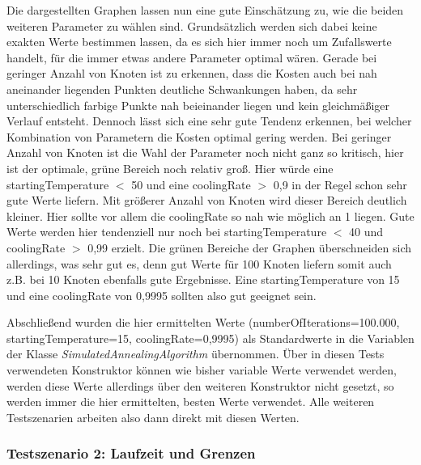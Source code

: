 Die dargestellten Graphen lassen nun eine gute Einschätzung zu, wie die beiden weiteren Parameter zu wählen sind. Grundsätzlich werden sich dabei keine exakten Werte bestimmen lassen, da es sich hier immer noch um Zufallswerte handelt, für die immer etwas andere Parameter optimal wären. Gerade bei geringer Anzahl von Knoten ist zu erkennen, dass die Kosten auch bei nah aneinander liegenden Punkten deutliche Schwankungen haben, da sehr unterschiedlich farbige Punkte nah beieinander liegen und kein gleichmäßiger Verlauf entsteht. Dennoch lässt sich eine sehr gute Tendenz erkennen, bei welcher Kombination von Parametern die Kosten optimal gering werden. Bei geringer Anzahl von Knoten ist die Wahl der Parameter noch nicht ganz so kritisch, hier ist der optimale, grüne Bereich noch relativ groß. Hier würde eine startingTemperature $<$ 50 und eine coolingRate $>$ 0,9 in der Regel schon sehr gute Werte liefern. Mit größerer Anzahl von Knoten wird dieser Bereich deutlich kleiner. Hier sollte vor allem die coolingRate so nah wie möglich an 1 liegen. Gute Werte werden hier tendenziell nur noch bei startingTemperature $<$ 40 und coolingRate $>$ 0,99 erzielt. Die grünen Bereiche der Graphen überschneiden sich allerdings, was sehr gut es, denn gut Werte für 100 Knoten liefern somit auch z.B. bei 10 Knoten ebenfalls gute Ergebnisse. Eine startingTemperature von 15 und eine coolingRate von 0,9995 sollten also gut geeignet sein.

Abschließend wurden die hier ermittelten Werte (numberOfIterations=100.000, startingTemperature=15, coolingRate=0,9995) als Standardwerte in die Variablen der Klasse \textit{SimulatedAnnealingAlgorithm} übernommen. Über in diesen Tests verwendeten Konstruktor können wie bisher variable Werte verwendet werden, werden diese Werte allerdings über den weiteren Konstruktor nicht gesetzt, so werden immer die hier ermittelten, besten Werte verwendet. Alle weiteren Testszenarien arbeiten also dann direkt mit diesen Werten.

\subsubsection{Testszenario 2: Laufzeit und Grenzen}

